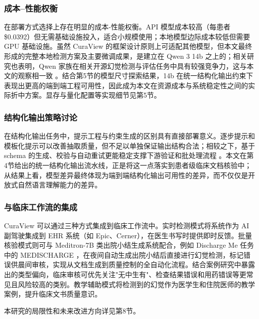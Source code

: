 \documentclass[11pt]{article}
\begin{document}
\subsubsection{成本--性能权衡}

在部署方式选择上存在明显的成本-性能权衡。API 模型成本较高（每患者 \$0.0392）但无需基础设施投入，适合小规模使用；本地模型边际成本较低但需要 GPU 基础设施。虽然 CuraView 的框架设计原则上可适配其他模型，但本文最终形成的完整本地检测方案及主要微调成果，是建立在 Qwen 3 14b 之上的；相关研究也表明，Qwen 家族在相关开源幻觉检测与评估任务中具有较强竞争力，这与本文的观察相一致 \citep{jiang2025bianHallucination,qi2025mixedContextHallucination,croxford2025clinicalAISummaries,ravi2024lynxEvaluation}。结合第5节的模型尺寸探索结果，14b 在统一结构化输出约束下表现出更高的端到端工程可用性，因此成为本文在资源成本与系统稳定性之间的实际折中方案。显存与量化配置等实现细节见第5节。

\subsubsection{结构化输出策略讨论}

在结构化输出任务中，提示工程与约束生成的区别具有直接部署意义。逐步提示和模板化提示可以改善抽取质量，但不足以单独保证输出结构合法；相较之下，基于 schema 的生成、校验与自动重试更能稳定支撑下游验证和批处理流程 \citep{langchain2024structuredOutput,liu2024structuredOutputBenchmark,lu2025schemaReinforcementLearning,geng2023grammarConstrainedDecoding}。本文在第4节给出的统一结构化输出流水线，正是将这一点落实到患者级临床文档核验中；从结果上看，模型差异最终体现为端到端结构化输出可用性的差异，而不仅仅是开放式自然语言理解能力的差异。

\subsubsection{与临床工作流的集成}

CuraView 可以通过三种方式集成到临床工作流中。实时检测模式将系统作为 AI 副驾驶集成到 EHR 系统（如 Epic、Cerner），在医生书写时提供即时反馈。批量核验模式则可与 Meditron-7B 类出院小结生成系统配合，例如 Discharge Me 任务中的 MEDISCHARGE \citep{wu2024epflMakeDischargeMe}，在夜间自动生成出院小结后直接进行幻觉检测，标记错误供晨间审核，实现从文档生成到质量控制的全自动化流程。结合案例研究中暴露出的类型偏向，临床审核可优先关注"无中生有"、检查结果错误和用药错误等更常见且风险较高的类别。教学辅助模式将检测到的幻觉作为医学生和住院医师的教学案例，提升临床文书质量意识。

本研究的局限性和未来改进方向详见第8节。
\end{document}
